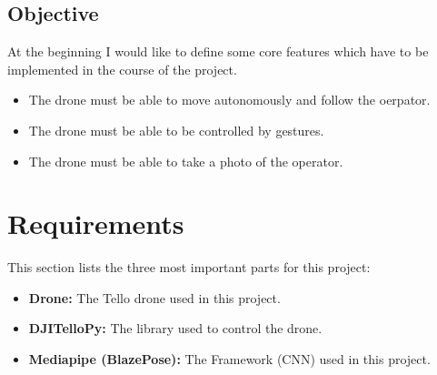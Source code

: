 \documentclass[a4paper,11pt,singlespacing]{article}
\begin{document}
\subsection{Objective}
At the beginning I would like to define some core features which have to be 
implemented in the course of the project.
\begin{itemize}
	\item The drone must be able to move autonomously and follow the oerpator.
	\item The drone must be able to be controlled by gestures.
	\item The drone must be able to take a photo of the operator.
\end{itemize}


\pagebreak
\section{Requirements}
This section lists the three most important parts for this project:
\begin{itemize}
	\item \textbf{Drone:} The Tello drone used in this project.
	\item \textbf{DJITelloPy:} The library used to control the drone.
	\item \textbf{Mediapipe (BlazePose):} The Framework (CNN) used in this project.
	
\end{itemize}
\end{document}
